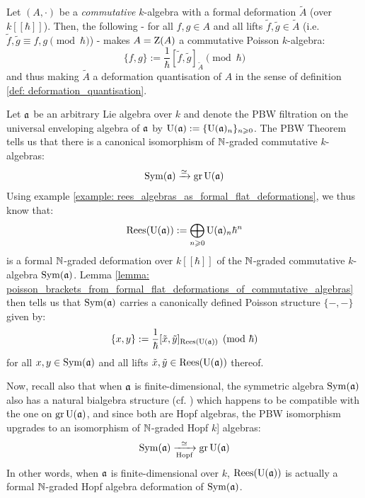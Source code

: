         \begin{corollary} \label{coro: deformation_quantisation_of_poisson_algebras_from_formal_flat_deformations}
            Let $(A, \cdot)$ be a \textit{commutative} $k$-algebra with a formal deformation $\tilde{A}$ (over $k[\![\hbar]\!]$). Then, the following - for all $f, g \in A$ and all lifts $\tilde{f}, \tilde{g} \in \tilde{A}$ (i.e. $\tilde{f}, \tilde{g} \equiv f, g \pmod{\hbar}$) - makes $A = \mathrm{Z}(A)$ a commutative Poisson $k$-algebra:
                $$\{f, g\} := \frac{1}{\hbar}[\tilde{f}, \tilde{g}]_{\tilde{A}} \pmod{\hbar}$$
            and thus making $\tilde{A}$ a deformation quantisation of $A$ in the sense of definition \ref{def: deformation_quantisation}.
        \end{corollary}
        \begin{example} \label{example: PBW_deformations}
            Let $\mathfrak{a}$ be an arbitrary Lie algebra over $k$ and denote the PBW filtration on the universal enveloping algebra of $\mathfrak{a}$ by $\mathrm{U}(\mathfrak{a}) := \{\mathrm{U}(\mathfrak{a})_n\}_{n \geqslant 0}$. The PBW Theorem tells us that there is a canonical isomorphism of $\mathbb{N}$-graded commutative $k$-algebras:
                $$\operatorname{Sym}(\mathfrak{a}) \xrightarrow[]{\simeq} \operatorname{gr} \mathrm{U}(\mathfrak{a})$$
            Using example \ref{example: rees_algebras_as_formal_flat_deformations}, we thus know that:
                $$\operatorname{Rees}(\mathrm{U}(\mathfrak{a})) := \bigoplus_{n \geqslant 0} \mathrm{U}(\mathfrak{a})_n \hbar^n$$
            is a formal $\mathbb{N}$-graded deformation over $k[\![\hbar]\!]$ of the $\mathbb{N}$-graded commutative $k$-algebra $\operatorname{Sym}(\mathfrak{a})$. Lemma \ref{lemma: poisson_brackets_from_formal_flat_deformations_of_commutative_algebras} then tells us that $\operatorname{Sym}(\mathfrak{a})$ carries a canonically defined Poisson structure $\{-, -\}$ given by:
                $$\{x, y\} := \frac{1}{\hbar}[\tilde{x}, \tilde{y}]_{\operatorname{Rees}(\mathrm{U}(\mathfrak{a}))} \pmod{\hbar}$$
            for all $x, y \in \operatorname{Sym}(\mathfrak{a})$ and all lifts $\tilde{x}, \tilde{y} \in \operatorname{Rees}(\mathrm{U}(\mathfrak{a}))$ thereof. 

            Now, recall also that when $\mathfrak{a}$ is finite-dimensional, the symmetric algebra $\operatorname{Sym}(\mathfrak{a})$ also has a natural bialgebra structure (cf. \cite[Chapter III]{kassel_quantum_groups}) which happens to be compatible with the one on $\operatorname{gr} \mathrm{U}(\mathfrak{a})$, and since both are Hopf algebras, the PBW isomorphism upgrades to an isomorphism of $\mathbb{N}$-graded Hopf $k$]
            algebras:
                $$\operatorname{Sym}(\mathfrak{a}) \xrightarrow[\text{Hopf}]{\simeq} \operatorname{gr} \mathrm{U}(\mathfrak{a})$$
            In other words, when $\mathfrak{a}$ is finite-dimensional over $k$, $\operatorname{Rees}(\mathrm{U}(\mathfrak{a}))$ is actually a formal $\mathbb{N}$-graded Hopf algebra deformation of $\operatorname{Sym}(\mathfrak{a})$. 
        \end{example}
    
